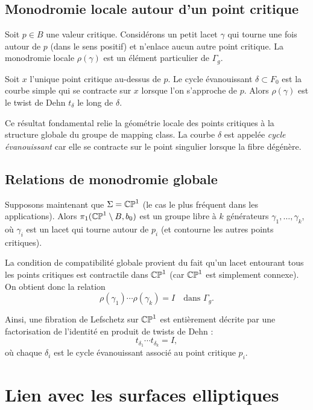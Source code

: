\subsection{Monodromie locale autour d'un point critique}

Soit $p \in B$ une valeur critique. Considérons un petit lacet $\gamma$ qui tourne une fois autour de $p$ (dans le sens positif) et n'enlace aucun autre point critique. La monodromie locale $\rho(\gamma)$ est un élément particulier de $\Gamma_g$.

\begin{theoreme}
Soit $x$ l'unique point critique au-dessus de $p$. Le cycle évanouissant $\delta \subset F_0$ est la courbe simple qui se contracte sur $x$ lorsque l'on s'approche de $p$. Alors $\rho(\gamma)$ est le twist de Dehn $t_\delta$ le long de $\delta$.
\end{theoreme}

Ce résultat fondamental relie la géométrie locale des points critiques à la structure globale du groupe de mapping class. La courbe $\delta$ est appelée \emph{cycle évanouissant} car elle se contracte sur le point singulier lorsque la fibre dégénère.

\subsection{Relations de monodromie globale}

Supposons maintenant que $\Sigma = \mathbb{CP}^1$ (le cas le plus fréquent dans les applications). Alors $\pi_1(\mathbb{CP}^1 \setminus B, b_0)$ est un groupe libre à $k$ générateurs $\gamma_1, \dots, \gamma_k$, où $\gamma_i$ est un lacet qui tourne autour de $p_i$ (et contourne les autres points critiques).

La condition de compatibilité globale provient du fait qu'un lacet entourant tous les points critiques est contractile dans $\mathbb{CP}^1$ (car $\mathbb{CP}^1$ est simplement connexe). On obtient donc la relation
\[
\rho(\gamma_1) \cdots \rho(\gamma_k) = I \quad \text{dans } \Gamma_g.
\]

Ainsi, une fibration de Lefschetz sur $\mathbb{CP}^1$ est entièrement décrite par une factorisation de l'identité en produit de twists de Dehn :
\[
t_{\delta_1} \cdots t_{\delta_k} = I,
\]
où chaque $\delta_i$ est le cycle évanouissant associé au point critique $p_i$.

\section{Lien avec les surfaces elliptiques}

